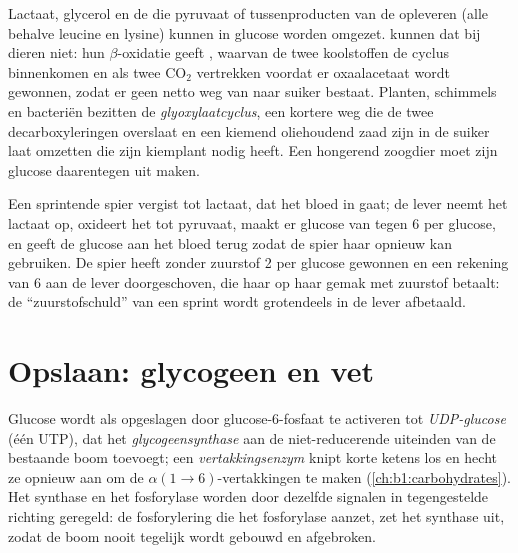\begin{proposition}\label{prop:b1:biosyntheses-integration:cannot}
Lactaat, glycerol en de  die pyruvaat of tussenproducten van de
 opleveren (alle behalve leucine en lysine) kunnen in glucose worden
omgezet.  kunnen dat bij dieren niet: hun $\beta$-oxidatie geeft
, waarvan de twee koolstoffen de cyclus binnenkomen en als twee
$\mathrm{CO_2}$ vertrekken voordat er oxaalacetaat wordt gewonnen, zodat er geen
netto weg van  naar suiker bestaat. Planten, schimmels en bacteriën
bezitten de \emph{glyoxylaatcyclus}, een kortere weg die de twee decarboxyleringen
overslaat en een kiemend oliehoudend zaad zijn  in de suiker laat omzetten die
zijn kiemplant nodig heeft. Een hongerend zoogdier moet zijn glucose daarentegen
uit  maken.
\end{proposition}

\begin{example}[De coricyclus]\label{ex:b1:biosyntheses-integration:cori}
Een sprintende spier vergist  tot lactaat, dat het bloed in gaat; de lever
neemt het lactaat op, oxideert het tot pyruvaat, maakt er glucose van tegen 6 
per glucose, en geeft de glucose aan het bloed terug zodat de spier haar opnieuw
kan gebruiken. De spier heeft zonder zuurstof 2  per glucose gewonnen en een
rekening van 6 aan de lever doorgeschoven, die haar op haar gemak met zuurstof
betaalt: de ``zuurstofschuld'' van een sprint wordt grotendeels in de lever
afbetaald.
\end{example}

\section{Opslaan: glycogeen en vet}

\begin{definition}[Glycogeensynthese]\label{def:b1:biosyntheses-integration:glycogensynthesis}
Glucose wordt als  opgeslagen door glucose-6-fosfaat te activeren tot
\emph{UDP-glucose} (één UTP), dat het \emph{glycogeensynthase} aan de
niet-reducerende uiteinden van de bestaande boom toevoegt; een
\emph{vertakkingsenzym} knipt korte ketens los en hecht ze opnieuw aan om de
$\alpha(1{\to}6)$-vertakkingen te maken (\cref{ch:b1:carbohydrates}). Het synthase
en het fosforylase worden door dezelfde signalen in tegengestelde richting
geregeld: de fosforylering die het fosforylase aanzet, zet het synthase uit, zodat
de boom nooit tegelijk wordt gebouwd en afgebroken.
\end{definition}

